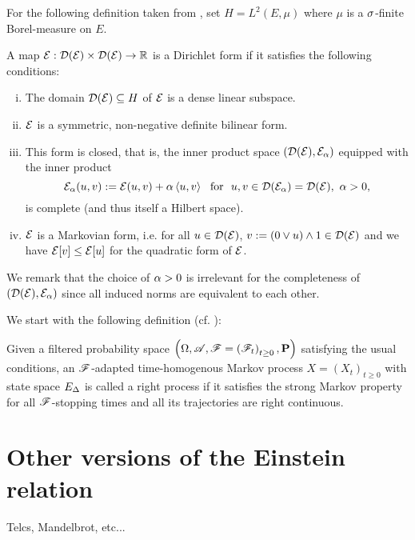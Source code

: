 For the following definition taken from \cite[p.3ff]{fukushima2011dirichlet}, set $H=L^2(E,\mu)$ where $\mu$ is a $\sigma$-finite Borel-measure on $E$. 
\begin{defin}
  A map $\mathcal{E}:\mathcal{D}(\mathcal{E})\times\mathcal{D}(\mathcal{E})\to\mathbb{R}$ is a Dirichlet form if it satisfies the following conditions:
  \begin{enumerate}[i.]
  \item The domain $\mathcal{D}(\mathcal{E})\subseteq H$ of $\mathcal{E}$ is a dense linear subspace.
  \item $\mathcal{E}$ is a symmetric, non-negative definite bilinear form.
  \item This form is closed, that is, the inner product space $(\mathcal{D}(\mathcal{E}),\mathcal{E}_\alpha)$ equipped with the inner product
  \[
    \cE_\ga(u,v):=\cE(u,v)+\ga\left<u,v\right>\ \text{ for }\ u,v\in\cD(\cE_\ga)=\cD(\cE),\ \ga>0,
  \]
  is complete (and thus itself a Hilbert space).
  \item $\mathcal{E}$ is a Markovian form, i.e. for all $u\in\mathcal{D}(\mathcal{E})$, $v:=(0\vee u)\wedge 1\in\mathcal{D}(\mathcal{E})$ and we have $\mathcal{E}[v]\leq\mathcal{E}[u]$ for the quadratic form of $\mathcal{E}$. 
  \end{enumerate}
\end{defin}
We remark that the choice of $\alpha>0$ is irrelevant for the completeness of $(\mathcal{D}(\mathcal{E}),\mathcal{E}_\alpha)$ since all induced norms are equivalent to each other. 




We start with the following definition (cf. \cite[Def. IV.1.13]{ma2012introduction}):
\begin{defin}
  Given a filtered probability space $\left(\Omega,\mathscr{A},\mathscr{F}=\left(\mathscr{F}_t\right)_{t\geq0},\mathbf{P}\right)$ satisfying the usual conditions, an $\mathscr{F}$-adapted time-homogenous Markov process $X=(X_t)_{t\geq0}$ with state space $E_\Delta$ is called a right process if it satisfies the strong Markov property for all $\mathscr{F}$-stopping times and all its trajectories are right continuous.  
\end{defin}

\section{Other versions of the Einstein relation}

Telcs, Mandelbrot, etc...

